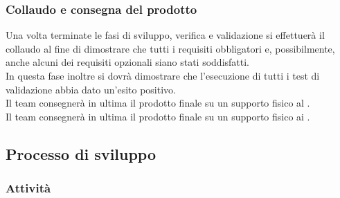 \subsubsection{Collaudo e consegna del prodotto}
Una volta terminate le fasi di sviluppo, verifica e validazione si effettuerà il collaudo al fine di dimostrare che tutti i requisiti obbligatori e, possibilmente, anche alcuni dei requisiti opzionali siano stati soddisfatti. 
\\In questa fase inoltre si dovrà dimostrare che l'esecuzione di tutti i test di validazione abbia dato un'esito positivo.
\\Il team consegnerà in ultima il prodotto finale su un supporto fisico al \committenti.
\\Il team consegnerà in ultima il prodotto finale su un supporto fisico ai \committenti.

\subsection{Processo di sviluppo}
\subsubsection{Attività}

